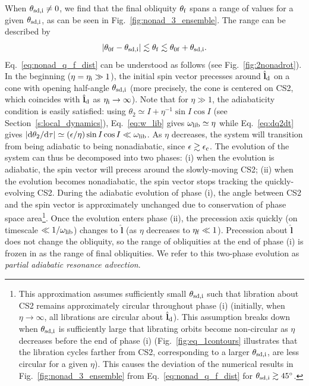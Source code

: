 \documentclass[twocolumn,twocolappendix]{aastex63}
\newcommand*{\rdil}[2]{\mathrm{d}#1 / \mathrm{d}#2}
\newcommand*{\abs}[1]{\left|#1\right|}
\newcommand*{\bsmb}[1]{\boldsymbol{\mathbf{#1}}}
\newcommand*{\uv}[1]{\hat{\bsmb{#1}}}
\newcommand*{\p}[1]{\left(#1\right)}
\begin{document}
When $\theta_{\rm sd, i}\neq 0$, we find that the final obliquity $\theta_{\rm
f}$ spans a range of values for a given $\theta_{\rm sd, i}$, as can be
seen in Fig.~\ref{fig:nonad_3_ensemble}. The range can be described by
\begin{equation}
    \abs{\theta_{\rm 0f} - \theta_{\rm sd, i}}
        \lesssim \theta_{\rm f}
        \lesssim \theta_{\rm 0f} + \theta_{\rm sd, i}
    .\label{eq:nonad_q_f_dist}
\end{equation}
Eq.~\eqref{eq:nonad_q_f_dist} can be understood as follows (see
Fig.~\ref{fig:2nonadrot}). In the beginning ($\eta = \eta_{\rm i} \gg 1$), the
initial spin vector precesses around $\uv{l}_{\rm d}$ on a cone with opening
half-angle $\theta_{\rm sd, i}$ (more precisely, the cone is centered on CS2,
which coincides with $\uv{l}_{\rm d}$ as $\eta_{\rm i} \to \infty$). Note that
for $\eta \gg 1$, the adiabaticity condition is easily satisfied: using
$\theta_2 \simeq I + \eta^{-1}\sin I \cos I$ (see
Section~\ref{s:local_dynamics}), Eq.~\eqref{eq:w_lib} gives $\omega_{\rm lib}
\simeq \eta$ while Eq.~\eqref{eq:dq2dt} gives $\abs{\rdil{\theta_2}{\tau}}
\simeq \p{\epsilon / \eta} \sin I \cos I \ll \omega_{\rm lib}$. As $\eta$
decreases, the system will transition from being adiabatic to being
nonadiabatic, since $\epsilon \gtrsim \epsilon_{\rm c}$. The evolution of the
system can thus be decomposed into two phases: (i) when the evolution is
adiabatic, the spin vector will precess around the slowly-moving CS2; (ii) when
the evolution becomes nonadiabatic, the spin vector stops tracking the
quickly-evolving CS2. During the adiabatic evolution of phase (i), the angle
between CS2 and the spin vector is approximately unchanged due to conservation
of phase space area\footnote{ This approximation assumes sufficiently small
$\theta_{\rm sd, i}$ such that libration about CS2 remains approximately
circular throughout phase (i) (initially, when $\eta \to \infty$, all librations
are circular about $\uv{l}_{\rm d}$). This assumption breaks down when
$\theta_{\rm sd, i}$ is sufficiently large that librating orbits become
non-circular as $\eta$ decreases before the end of phase (i)
(Fig.~\ref{fig:eq_1contours} illustrates that the libration cycles farther from
CS2, corresponding to a larger $\theta_{\rm sd, i}$, are less circular for a
given $\eta$).
This causes the deviation of the numerical results in
Fig.~\ref{fig:nonad_3_ensemble} from Eq.~\eqref{eq:nonad_q_f_dist} for
$\theta_{\rm sd, i} \gtrsim 45^\circ$. }.
Once the evolution enters phase (ii), the precession axis
quickly (on timescale $\ll 1 / \omega_{\rm lib}$) changes to $\uv{l}$ (as $\eta$
decreases to $\eta_{\rm f} \ll 1$). Precession about $\uv{l}$ does not change the
obliquity, so the range of obliquities at the end of phase (i) is frozen in as
the range of final obliquities. \textcolor{Corr}{We refer to this two-phase
evolution as \emph{partial adiabatic resonance advection}.}
\end{document}
